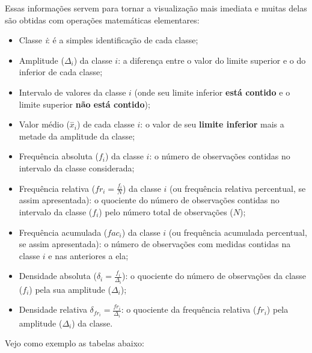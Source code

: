 \documentclass[
]{book}
\providecommand{\tightlist}{%
  \setlength{\itemsep}{0pt}\setlength{\parskip}{0pt}}
\begin{document}
Essas informações servem para tornar a visualização mais imediata e muitas delas são obtidas com operações matemáticas elementares:

\hfill\break

\begin{itemize}
\tightlist
\item
  Classe \emph{i}: é a simples identificação de cada classe;
\item
  Amplitude (\(\Delta_{i}\)) da classe \(i\): a diferença entre o valor do limite superior e o do inferior de cada classe;
\item
  Intervalo de valores da classe \(i\) (onde seu limite inferior \textbf{está contido} e o limite superior \textbf{não está contido});
\item
  Valor médio (\(\stackrel{-}{x}_{i}\)) de cada classe \(i\): o valor de seu \textbf{limite inferior} mais a metade da amplitude da classe;
\item
  Frequência absoluta (\(f_{i}\)) da classe \(i\): o número de observações contidas no intervalo da classe considerada;
\item
  Frequência relativa (\(fr_{i}= \frac{f_{i}}{N}\)) da classe \(i\) (ou frequência relativa percentual, se assim apresentada): o quociente do número de observações contidas no intervalo da classe (\(f_{i}\)) pelo número total de observações (\(N\));
\item
  Frequência acumulada (\(fac_{i}\)) da classe \(i\) (ou frequência acumulada percentual, se assim apresentada): o número de observações com medidas contidas na classe \(i\) e nas anteriores a ela;
\item
  Densidade absoluta (\(\delta_{i}=\frac{f_{i}}{\Delta_{i}}\)): o quociente do número de observações da classe (\(f_{i}\)) pela sua amplitude (\(\Delta_{i}\));
\item
  Densidade relativa \(\delta_{fr_{i}}=\frac{fr_{i}}{\Delta_{i}}\): o quociente da frequência relativa (\(fr_{i}\)) pela amplitude (\(\Delta_{i}\)) da classe.
\end{itemize}

\hfill\break

Vejo como exemplo as tabelas abaixo:

\hfill\break
\end{document}
